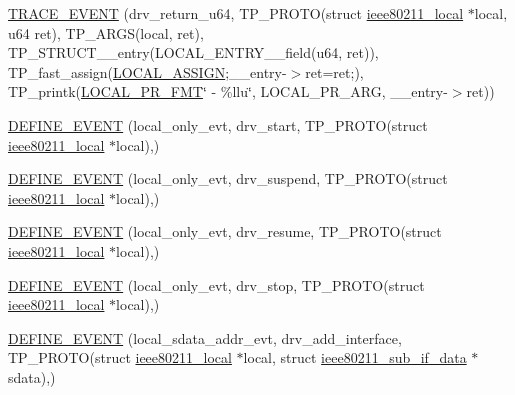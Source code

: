 \begin{DoxyCompactItemize}
\item 
\hyperlink{driver-trace_8h_a64ee57f1a21f47020d47396e9e9de6fc}{T\-R\-A\-C\-E\-\_\-\-E\-V\-E\-N\-T} (drv\-\_\-return\-\_\-u64, T\-P\-\_\-\-P\-R\-O\-T\-O(struct \hyperlink{structieee80211__local}{ieee80211\-\_\-local} $\ast$local, u64 ret), T\-P\-\_\-\-A\-R\-G\-S(local, ret), T\-P\-\_\-\-S\-T\-R\-U\-C\-T\-\_\-\-\_\-entry(L\-O\-C\-A\-L\-\_\-\-E\-N\-T\-R\-Y\-\_\-\-\_\-field(u64, ret)), T\-P\-\_\-fast\-\_\-assign(\hyperlink{driver-trace_8h_ab19d9141887ea92ef9640df06a51e0a1}{L\-O\-C\-A\-L\-\_\-\-A\-S\-S\-I\-G\-N};\-\_\-\-\_\-entry-\/$>$ret=ret;), T\-P\-\_\-printk(\hyperlink{driver-trace_8h_a09833af423135e21ffe99a59ae088cf1}{L\-O\-C\-A\-L\-\_\-\-P\-R\-\_\-\-F\-M\-T}\char`\"{} -\/ \%llu\char`\"{}, L\-O\-C\-A\-L\-\_\-\-P\-R\-\_\-\-A\-R\-G, \-\_\-\-\_\-entry-\/$>$ret))
\item 
\hyperlink{driver-trace_8h_abe7821f60c9623fc2923f35a791b37fc}{D\-E\-F\-I\-N\-E\-\_\-\-E\-V\-E\-N\-T} (local\-\_\-only\-\_\-evt, drv\-\_\-start, T\-P\-\_\-\-P\-R\-O\-T\-O(struct \hyperlink{structieee80211__local}{ieee80211\-\_\-local} $\ast$local),)
\item 
\hyperlink{driver-trace_8h_a769bdbbd944e8cab146934c472591525}{D\-E\-F\-I\-N\-E\-\_\-\-E\-V\-E\-N\-T} (local\-\_\-only\-\_\-evt, drv\-\_\-suspend, T\-P\-\_\-\-P\-R\-O\-T\-O(struct \hyperlink{structieee80211__local}{ieee80211\-\_\-local} $\ast$local),)
\item 
\hyperlink{driver-trace_8h_ac5e83fed704cad7790ebe310a8164027}{D\-E\-F\-I\-N\-E\-\_\-\-E\-V\-E\-N\-T} (local\-\_\-only\-\_\-evt, drv\-\_\-resume, T\-P\-\_\-\-P\-R\-O\-T\-O(struct \hyperlink{structieee80211__local}{ieee80211\-\_\-local} $\ast$local),)
\item 
\hyperlink{driver-trace_8h_a6f04814a3b7909ae1c72264d395dfe97}{D\-E\-F\-I\-N\-E\-\_\-\-E\-V\-E\-N\-T} (local\-\_\-only\-\_\-evt, drv\-\_\-stop, T\-P\-\_\-\-P\-R\-O\-T\-O(struct \hyperlink{structieee80211__local}{ieee80211\-\_\-local} $\ast$local),)
\item 
\hyperlink{driver-trace_8h_a0942846f56df5f2e18c0d394ac3f1feb}{D\-E\-F\-I\-N\-E\-\_\-\-E\-V\-E\-N\-T} (local\-\_\-sdata\-\_\-addr\-\_\-evt, drv\-\_\-add\-\_\-interface, T\-P\-\_\-\-P\-R\-O\-T\-O(struct \hyperlink{structieee80211__local}{ieee80211\-\_\-local} $\ast$local, struct \hyperlink{structieee80211__sub__if__data}{ieee80211\-\_\-sub\-\_\-if\-\_\-data} $\ast$sdata),)
\item 

\end{DoxyCompactItemize}
